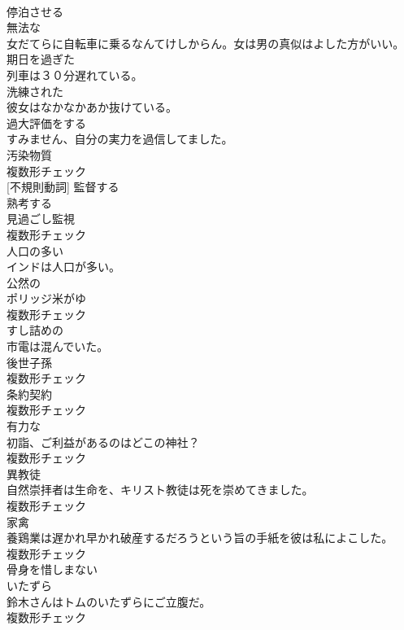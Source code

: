 \documentclass[8pt]{extreport}
\begin{document}
\begin{CJK}{UTF8}{min}
\\	[動詞]	停泊させる	
\\	[形容詞]	無法な	
\\	女だてらに自転車に乗るなんてけしからん。女は男の真似はよした方がいい。	
\\	[形容詞]	期日を過ぎた	
\\	列車は３０分遅れている。	
\\	[形容詞]	洗練された	
\\	彼女はなかなかあか抜けている。	
\\	[動詞]	過大評価をする	
\\	すみません、自分の実力を過信してました。	
\\	[名詞]	汚染物質	
\\	複数形チェック
\\	[動詞] [不規則動詞]	監督する	
\\	[動詞]	熟考する	
\\	[名詞]	見過ごし監視	
\\	複数形チェック
\\	[形容詞]	人口の多い	
\\	インドは人口が多い。	
\\	[形容詞]	公然の	
\\	[名詞]	ポリッジ米がゆ	
\\	複数形チェック
\\	[形容詞]	すし詰めの	
\\	市電は混んでいた。	
\\	[名詞]	後世子孫	
\\	複数形チェック
\\	[名詞]	条約契約	
\\	複数形チェック
\\	[名詞]	有力な	
\\	初詣、ご利益があるのはどこの神社？	
\\	複数形チェック
\\	[名詞]	異教徒	
\\	自然崇拝者は生命を、キリスト教徒は死を崇めてきました。	
\\	複数形チェック
\\	[名詞]	家禽	
\\	養鶏業は遅かれ早かれ破産するだろうという旨の手紙を彼は私によこした。	
\\	複数形チェック
\\	[形容詞]	骨身を惜しまない	
\\	[名詞]	いたずら	
\\	鈴木さんはトムのいたずらにご立腹だ。	
\\	複数形チェック

\end{CJK}
\end{document}
